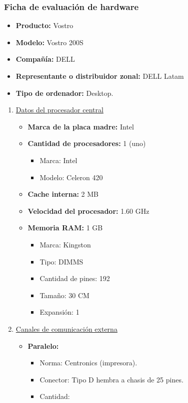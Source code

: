 \subsubsection{Ficha de evaluación de hardware}
\begin{itemize}
  \item \textbf{Producto:} Vostro
  \item \textbf{Modelo:} Vostro 200S
  \item \textbf{Compañía:} DELL
  \item \textbf{Representante o distribuidor zonal:} DELL Latam
  \item \textbf{Tipo de ordenador:} Desktop.
\end{itemize}

\begin{enumerate}

  \item \underline{Datos del procesador central}
  \begin{itemize}
    \item \textbf{Marca de la placa madre:} Intel
    
    \item \textbf{Cantidad de procesadores:} 1 (uno)
    \begin{itemize}
      \item Marca: Intel
      \item Modelo: Celeron 420
    \end{itemize}
    
    \item \textbf{Cache interna:} 2 MB
    \item \textbf{Velocidad del procesador:} 1.60 GHz
    \item \textbf{Memoria RAM:} 1 GB
    
    \begin{itemize}
      \item Marca: Kingston
      \item Tipo: DIMMS 
      \item Cantidad de pines: 192
      \item Tamaño: 30 CM 
      \item Expansión: 1
    \end{itemize}
  \end{itemize}
  
  
  \item \underline{Canales de comunicación externa}
  \begin{itemize}
    \item \textbf{Paralelo:}
    \begin{itemize}
      \item Norma: Centronics (impresora).
      \item Conector: Tipo D hembra a chasis de 25 pines.
      \item Cantidad:
    \end{itemize}
    

\end{itemize}
\end{enumerate}
